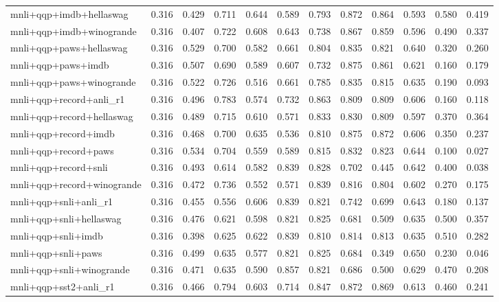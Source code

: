 \begin{table}[t]
\begin{tabular}{lrrrrrrrrrrr}
    mnli+qqp+imdb+hellaswag & 0.316 & 0.429 & 0.711 & 0.644 & 0.589 & 0.793 & 0.872 & 0.864 & 0.593 & 0.580 & 0.419 \\
    mnli+qqp+imdb+winogrande & 0.316 & 0.407 & 0.722 & 0.608 & 0.643 & 0.738 & 0.867 & 0.859 & 0.596 & 0.490 & 0.337 \\
    mnli+qqp+paws+hellaswag & 0.316 & 0.529 & 0.700 & 0.582 & 0.661 & 0.804 & 0.835 & 0.821 & 0.640 & 0.320 & 0.260 \\
    mnli+qqp+paws+imdb & 0.316 & 0.507 & 0.690 & 0.589 & 0.607 & 0.732 & 0.875 & 0.861 & 0.621 & 0.160 & 0.179 \\
    mnli+qqp+paws+winogrande & 0.316 & 0.522 & 0.726 & 0.516 & 0.661 & 0.785 & 0.835 & 0.815 & 0.635 & 0.190 & 0.093 \\
    mnli+qqp+record+anli\_r1 & 0.316 & 0.496 & 0.783 & 0.574 & 0.732 & 0.863 & 0.809 & 0.809 & 0.606 & 0.160 & 0.118 \\
    mnli+qqp+record+hellaswag & 0.316 & 0.489 & 0.715 & 0.610 & 0.571 & 0.833 & 0.830 & 0.809 & 0.597 & 0.370 & 0.364 \\
    mnli+qqp+record+imdb & 0.316 & 0.468 & 0.700 & 0.635 & 0.536 & 0.810 & 0.875 & 0.872 & 0.606 & 0.350 & 0.237 \\
    mnli+qqp+record+paws & 0.316 & 0.534 & 0.704 & 0.559 & 0.589 & 0.815 & 0.832 & 0.823 & 0.644 & 0.100 & 0.027 \\
    mnli+qqp+record+snli & 0.316 & 0.493 & 0.614 & 0.582 & 0.839 & 0.828 & 0.702 & 0.445 & 0.642 & 0.400 & 0.038 \\
    mnli+qqp+record+winogrande & 0.316 & 0.472 & 0.736 & 0.552 & 0.571 & 0.839 & 0.816 & 0.804 & 0.602 & 0.270 & 0.175 \\
    mnli+qqp+snli+anli\_r1 & 0.316 & 0.455 & 0.556 & 0.606 & 0.839 & 0.821 & 0.742 & 0.699 & 0.643 & 0.180 & 0.137 \\
    mnli+qqp+snli+hellaswag & 0.316 & 0.476 & 0.621 & 0.598 & 0.821 & 0.825 & 0.681 & 0.509 & 0.635 & 0.500 & 0.357 \\
    mnli+qqp+snli+imdb & 0.316 & 0.398 & 0.625 & 0.622 & 0.839 & 0.810 & 0.814 & 0.813 & 0.635 & 0.510 & 0.282 \\
    mnli+qqp+snli+paws & 0.316 & 0.499 & 0.635 & 0.577 & 0.821 & 0.825 & 0.684 & 0.349 & 0.650 & 0.230 & 0.046 \\
    mnli+qqp+snli+winogrande & 0.316 & 0.471 & 0.635 & 0.590 & 0.857 & 0.821 & 0.686 & 0.500 & 0.629 & 0.470 & 0.208 \\
    mnli+qqp+sst2+anli\_r1 & 0.316 & 0.466 & 0.794 & 0.603 & 0.714 & 0.847 & 0.872 & 0.869 & 0.613 & 0.460 & 0.241 \\

\end{tabular}
\end{table}
